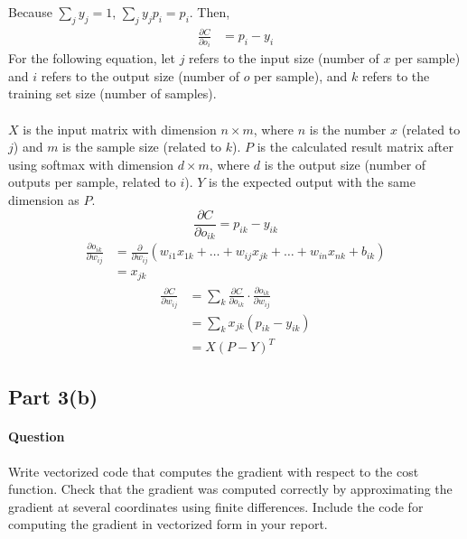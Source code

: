\documentclass[11pt,twoside]{article}
\begin{document}
Because $\sum_{j}y_j = 1$, $\sum_{j}y_jp_i = p_i$. Then,
\begin{align*}
\frac{\partial C}{\partial o_{i}} &= p_i - y_i
\end{align*}
For the following equation, let $j$ refers to the input size (number of $x$ per sample) and $i$ refers to the output size (number of $o$ per sample), and $k$ refers to the training set size (number of samples).\\
\\
$X$ is the input matrix with dimension $n \times m$, where $n$ is the number $x$ (related to $j$) and $m$ is the sample size (related to $k$). $P$ is the calculated result matrix after using softmax with dimension $d \times m$, where $d$ is the output size (number of outputs per sample, related to $i$). $Y$ is the expected output with the same dimension as $P$.
\[\frac{\partial C}{\partial o_{ik}} = p_{ik} - y_{ik}\]
\begin{align*}
\frac{\partial o_{ik}}{\partial w_{ij}} &= \frac{\partial}{\partial w_{ij}}(w_{i1}x_{1k}+\dots+w_{ij}x_{jk}+\dots+w_{in}x_{nk}+b_{ik})\\
&=x_{jk}
\end{align*}
\begin{align*}
\frac{\partial C}{\partial w_{ij}} &= \sum_{k}\frac{\partial C}{\partial o_{ik}} \cdot \frac{\partial o_{ik}}{\partial w_{ij}}\\
&= \sum_{k}x_{jk}(p_{ik} - y_{ik})\\
&= X(P - Y)^T
\end{align*}
\subsection*{Part 3(b)}
\paragraph{Question}
Write vectorized code that computes the gradient with respect to the cost function. Check that the gradient was computed correctly by approximating the gradient at several coordinates using finite differences. Include the code for computing the gradient in vectorized form in your report.
\end{document}
